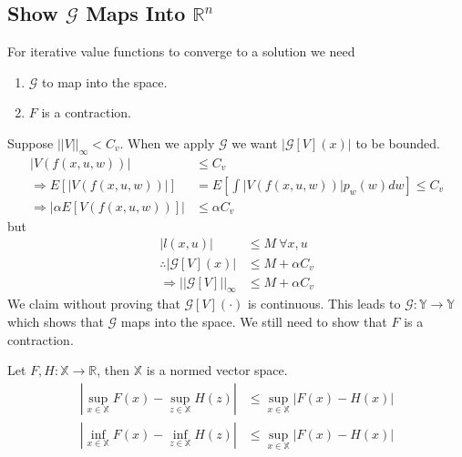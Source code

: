 \subsection{Show $\mathcal{G}$ Maps Into $\mathbb{R}^n$}
For iterative value functions to converge to a solution we need
\begin{enumerate}
\item $\mathcal{G}$ to map into the space.
\item $F$ is a contraction.
\end{enumerate}
Suppose $||V||_\infty<C_v$. When we apply $\mathcal{G}$ we want $|\mathcal{G}[V](x)|$ to be bounded.
\begin{align*}
|V(f(x,u,w))| &\leq C_v \\
\Rightarrow E[|V(f(x,u,w))|] &= E[\int|V(f(x,u,w))|p_w(w)dw] \leq C_v \\
\Rightarrow |\alpha E[V(f(x,u,w))]| &\leq \alpha C_v
\end{align*}
but
\begin{align*}
|l(x,u)| &\leq M ~\forall x,u \\
\therefore |\mathcal{G}[V](x)| &\leq M + \alpha C_v \\
\Rightarrow ||\mathcal{G}[V]||_\infty &\leq M + \alpha C_v
\end{align*}
We claim without proving that $\mathcal{G}[V](\cdot)$ is continuous. This leads to $\mathcal{G}:\mathbb{Y}\to\mathbb{Y}$ which shows that $\mathcal{G}$ maps into the space. We still need to show that $F$ is a contraction.

\begin{theorem}
\label{th:nvs}
Let $F,H:\mathbb{X}\to\mathbb{R}$, then $\mathbb{X}$ is a normed vector space.
\begin{align*}
|\sup_{x\in\mathbb{X}}F(x) - \sup_{z\in\mathbb{X}}H(z)| &\leq \sup_{x\in\mathbb{X}}|F(x)-H(x)| \\
|\inf_{x\in\mathbb{X}}F(x) - \inf_{z\in\mathbb{X}}H(z)| &\leq \sup_{x\in\mathbb{X}}|F(x)-H(x)|
\end{align*}
\end{theorem}

